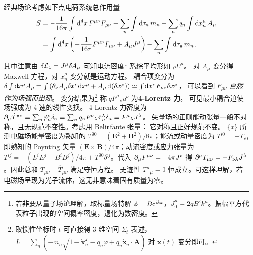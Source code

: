 经典场论考虑如下点电荷系统总作用量
\begin{align}
    S &= -\frac{1}{16\pi}\int\dd[4]{x}F^{\mu\nu} F_{\mu\nu} -\sum_n\int\dd{\tau_n} m_n+ \sum_n q_n \int\dd{x^\mu_n} A_\mu\\
    &= \int\dd[4]{x} \left(-\frac{1}{16\pi}F^{\mu\nu} F_{\mu\nu}+A_\mu J^\mu\right) - \sum_n\int\dd{\tau_n} m_n\notag,
\end{align}
其中注意由 $\delta\mathcal{L}_1=J^\mu\delta A_\mu$ 可知电流密度\footnote{若非要从量子场论理解，取标量场特解 $\phi = B\mathrm{e}^{\mathrm{i} kx}$，$J^\mu_0 = 2 q B^2 k^\mu$。振幅平方代表粒子出现的空间概率密度，退化为数密度。}
系综平均形如 $\rho U^\mu$。
对 $A_\mu$ 变分得 Maxwell 方程，对 $x^\mu_n$ 变分就是运动方程。
耦合项变分为 $\delta \int\dd x^\mu A_\mu=\int\left(\partial_\nu A_{\mu} \delta x^\nu \dd x^\mu+A_\mu \dd(\delta x^\mu)\right) \simeq \int\dd x^\nu F_{\mu \nu} \delta x^\mu$，
可以看到 $F_{\mu\nu}$ \emph{自然作为场强而出现}。
变分结果为\footnote{取惯性坐标时 $t$ 可直接得 3 维空间 $\Sigma_t$ 表述，$L=\sum_n(-m_n\sqrt{1-\dot{\bm x}_n^2}-q_n\varphi+q_n\dot{\bm x}_n\cdot\bm A)$ 对 $\bm x(t)$ 变分即可。}
称 $q F^{\mu}{}_{\nu}u^\nu$ 为\textbf{4-Lorentz 力}。 
可见最小耦合迫使场强成为 4-速的线性变换。
4-Lorentz 力密度为 $\partial_\mu\hat T^{\mu\nu} = \sum_n \dot p^\nu_n \delta_n = \sum_n q_n F^{\nu}{}_{\lambda}\dot x^\lambda_n \delta_n = F^{\mu}{}_{\lambda} J^\lambda$。
矢量场的正则能动张量一般不对称，且无规范不变性。考虑用 Belinfante 张量：
它对称且正好规范不变。
$\{x\}$ 所测电磁场能量密度为熟知的 $T^{00}=(\bm E^2+\bm B^2)/8\pi$；能流或动量密度为 $T^{i0}=-T_{i0}$ 即熟知的 Poynting 矢量 $(\bm E\times \bm B) / 4\pi$；动流密度或应力张量为 $T^{ij}=-(E^i E^j+B^i B^j)/4\pi+T^{00}\delta^{ij}$。代入 $\partial_\mu F^{\mu\nu}=-4 \pi J^\nu$ 得
$\partial^\mu T_{\mu\nu}=-F_{\nu\lambda}J^\lambda$。因此总和 $T_{\mu\nu} + \hat T_{\mu\nu}$ 满足守恒方程。
无迹性 $T^\mu{}_\mu=0$ 恒成立。可这样理解，若电磁场呈现为光子流体，这无非意味着固有质量为零。


